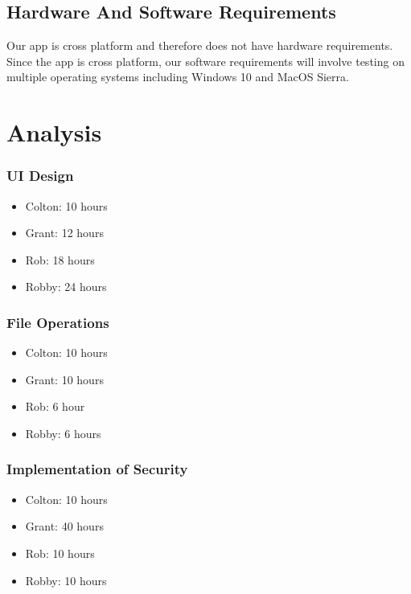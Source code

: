 \documentclass[11pt]{report}
\begin{document}
\section{Hardware And Software Requirements}
Our app is cross platform and therefore does not have hardware requirements. 
Since the app is cross platform, our software requirements will involve 
testing on multiple operating systems including Windows 10 and MacOS Sierra.



\chapter{Analysis}

\subsection*{UI Design}
\begin{itemize}
    \item Colton: 10 hours
    \item Grant: 12 hours
    \item Rob: 18 hours
    \item Robby: 24 hours
\end{itemize}

\subsection*{File Operations}
\begin{itemize}
    \item Colton: 10 hours
    \item Grant: 10 hours
    \item Rob:  6 hour
    \item Robby: 6 hours
\end{itemize}

\subsection*{Implementation of Security}
\begin{itemize}
    \item Colton: 10 hours
    \item Grant: 40 hours
    \item Rob: 10 hours
    \item Robby: 10 hours
\end{itemize}
\end{document}
